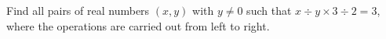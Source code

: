 Find all pairs of real numbers $(x,y)$ with $y\ne0$ such that $x\div y\times3\div2=3$, where the operations are carried out from left to right.
